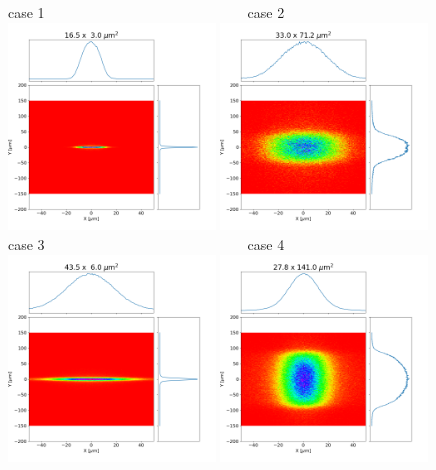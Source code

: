 \documentclass[]{article}
\begin{document}
  

\thispagestyle{empty}



\begin{figure}
    \centering
    case 1~~~~~~~~~~~~~~~~~~~~~~~~~~~~~case 2\\
    \includegraphics[width=0.49\textwidth]{figures/case1_hybrid.png}
    \includegraphics[width=0.49\textwidth]{figures/case2_hybrid.png}\\
    case 3~~~~~~~~~~~~~~~~~~~~~~~~~~~~~case 4\\
    \includegraphics[width=0.49\textwidth]{figures/case3_hybrid.png}
    \includegraphics[width=0.49\textwidth]{figures/case4_hybrid.png}
\end{figure}
\end{document}
